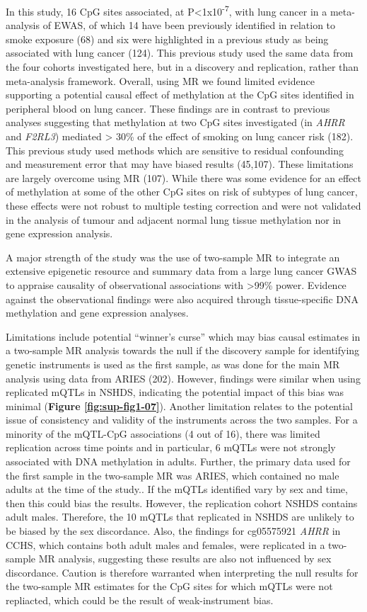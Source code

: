 \documentclass[11pt,oneside]{bristolthesis}
\begin{document}
In this study, 16 CpG sites associated, at P\textless1x10\textsuperscript{-7}, with lung cancer in a meta-analysis of EWAS, of which 14 have been previously identified in relation to smoke exposure (68) and six were highlighted in a previous study as being associated with lung cancer (124). This previous study used the same data from the four cohorts investigated here, but in a discovery and replication, rather than meta-analysis framework. Overall, using MR we found limited evidence supporting a potential causal effect of methylation at the CpG sites identified in peripheral blood on lung cancer. These findings are in contrast to previous analyses suggesting that methylation at two CpG sites investigated (in \emph{AHRR} and \emph{F2RL3}) mediated \textgreater{} 30\% of the effect of smoking on lung cancer risk (182). This previous study used methods which are sensitive to residual confounding and measurement error that may have biased results (45,107). These limitations are largely overcome using MR (107). While there was some evidence for an effect of methylation at some of the other CpG sites on risk of subtypes of lung cancer, these effects were not robust to multiple testing correction and were not validated in the analysis of tumour and adjacent normal lung tissue methylation nor in gene expression analysis.

A major strength of the study was the use of two-sample MR to integrate an extensive epigenetic resource and summary data from a large lung cancer GWAS to appraise causality of observational associations with \textgreater99\% power. Evidence against the observational findings were also acquired through tissue-specific DNA methylation and gene expression analyses.

Limitations include potential ``winner's curse'' which may bias causal estimates in a two-sample MR analysis towards the null if the discovery sample for identifying genetic instruments is used as the first sample, as was done for the main MR analysis using data from ARIES (202). However, findings were similar when using replicated mQTLs in NSHDS, indicating the potential impact of this bias was minimal (\textbf{Figure \ref{fig:sup-fig1-07}}). Another limitation relates to the potential issue of consistency and validity of the instruments across the two samples. For a minority of the mQTL-CpG associations (4 out of 16), there was limited replication across time points and in particular, 6 mQTLs were not strongly associated with DNA methylation in adults. Further, the primary data used for the first sample in the two-sample MR was ARIES, which contained no male adults at the time of the study.. If the mQTLs identified vary by sex and time, then this could bias the results. However, the replication cohort NSHDS contains adult males. Therefore, the 10 mQTLs that replicated in NSHDS are unlikely to be biased by the sex discordance. Also, the findings for cg05575921 \emph{AHRR} in CCHS, which contains both adult males and females, were replicated in a two-sample MR analysis, suggesting these results are also not influenced by sex discordance. Caution is therefore warranted when interpreting the null results for the two-sample MR estimates for the CpG sites for which mQTLs were not repliacted, which could be the result of weak-instrument bias.
\end{document}
